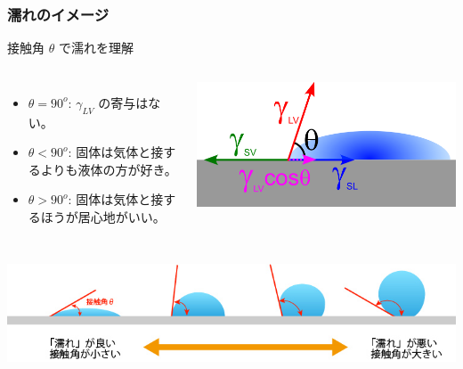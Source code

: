 \documentclass[unicode,12pt]{beamer}%
\begin{document}
\begin{frame}
	\frametitle{濡れのイメージ}
	
		\begin{block}{接触角 $\theta$ で濡れを理解}
			\begin{columns}[c, onlytextwidth]
					\begin{itemize}
						\item $\theta = 90^{o}$: $\gamma_{LV}$ の寄与はない。
						\item $\theta < 90^{o}$: 固体は気体と接するよりも液体の方が好き。
						\item $\theta > 90^{o}$: 固体は気体と接するほうが居心地がいい。
					\end{itemize}
				\centering
				\includegraphics[width=\textwidth]{young.png}
			\end{columns}
		\end{block}
	\vspace{5mm}
	\centering
			\includegraphics[width=\textwidth]{wetting.png}
\end{frame}
\end{document}
